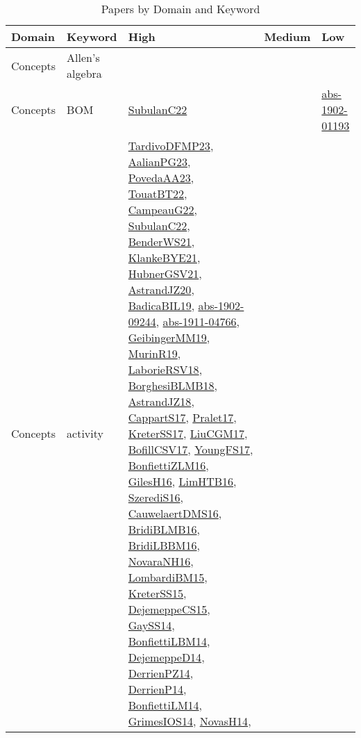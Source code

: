 {\scriptsize
\begin{longtable}{lp{3cm}>{\raggedright}p{6cm}>{\raggedright}p{6cm}p{8cm}}
\caption{Papers by Domain and Keyword}\\ \toprule
Domain & Keyword & High & Medium & Low\\ \midrule\endhead
\bottomrule
\endfoot
Concepts & Allen's algebra &  &  & \\
Concepts & BOM & \href{articles/SubulanC22.pdf}{SubulanC22}\cite{SubulanC22} &  & \href{articles/abs-1902-01193.pdf}{abs-1902-01193}\cite{abs-1902-01193}\\
Concepts & activity & \href{papers/TardivoDFMP23.pdf}{TardivoDFMP23}\cite{TardivoDFMP23}, \href{papers/AalianPG23.pdf}{AalianPG23}\cite{AalianPG23}, \href{papers/PovedaAA23.pdf}{PovedaAA23}\cite{PovedaAA23}, \href{papers/TouatBT22.pdf}{TouatBT22}\cite{TouatBT22}, \href{articles/CampeauG22.pdf}{CampeauG22}\cite{CampeauG22}, \href{articles/SubulanC22.pdf}{SubulanC22}\cite{SubulanC22}, \href{papers/BenderWS21.pdf}{BenderWS21}\cite{BenderWS21}, \href{papers/KlankeBYE21.pdf}{KlankeBYE21}\cite{KlankeBYE21}, \href{articles/HubnerGSV21.pdf}{HubnerGSV21}\cite{HubnerGSV21}, \href{articles/AstrandJZ20.pdf}{AstrandJZ20}\cite{AstrandJZ20}, \href{papers/BadicaBIL19.pdf}{BadicaBIL19}\cite{BadicaBIL19}, \href{articles/abs-1902-09244.pdf}{abs-1902-09244}\cite{abs-1902-09244}, \href{articles/abs-1911-04766.pdf}{abs-1911-04766}\cite{abs-1911-04766}, \href{papers/GeibingerMM19.pdf}{GeibingerMM19}\cite{GeibingerMM19}, \href{papers/MurinR19.pdf}{MurinR19}\cite{MurinR19}, \href{articles/LaborieRSV18.pdf}{LaborieRSV18}\cite{LaborieRSV18}, \href{articles/BorghesiBLMB18.pdf}{BorghesiBLMB18}\cite{BorghesiBLMB18}, \href{papers/AstrandJZ18.pdf}{AstrandJZ18}\cite{AstrandJZ18}, \href{papers/CappartS17.pdf}{CappartS17}\cite{CappartS17}, \href{papers/Pralet17.pdf}{Pralet17}\cite{Pralet17}, \href{articles/KreterSS17.pdf}{KreterSS17}\cite{KreterSS17}, \href{papers/LiuCGM17.pdf}{LiuCGM17}\cite{LiuCGM17}, \href{papers/BofillCSV17.pdf}{BofillCSV17}\cite{BofillCSV17}, \href{papers/YoungFS17.pdf}{YoungFS17}\cite{YoungFS17}, \href{papers/BonfiettiZLM16.pdf}{BonfiettiZLM16}\cite{BonfiettiZLM16}, \href{papers/GilesH16.pdf}{GilesH16}\cite{GilesH16}, \href{papers/LimHTB16.pdf}{LimHTB16}\cite{LimHTB16}, \href{papers/SzerediS16.pdf}{SzerediS16}\cite{SzerediS16}, \href{papers/CauwelaertDMS16.pdf}{CauwelaertDMS16}\cite{CauwelaertDMS16}, \href{articles/BridiBLMB16.pdf}{BridiBLMB16}\cite{BridiBLMB16}, \href{papers/BridiLBBM16.pdf}{BridiLBBM16}\cite{BridiLBBM16}, \href{articles/NovaraNH16.pdf}{NovaraNH16}\cite{NovaraNH16}, \href{papers/LombardiBM15.pdf}{LombardiBM15}\cite{LombardiBM15}, \href{papers/KreterSS15.pdf}{KreterSS15}\cite{KreterSS15}, \href{papers/DejemeppeCS15.pdf}{DejemeppeCS15}\cite{DejemeppeCS15}, \href{papers/GaySS14.pdf}{GaySS14}\cite{GaySS14}, \href{articles/BonfiettiLBM14.pdf}{BonfiettiLBM14}\cite{BonfiettiLBM14}, \href{papers/DejemeppeD14.pdf}{DejemeppeD14}\cite{DejemeppeD14}, \href{papers/DerrienPZ14.pdf}{DerrienPZ14}\cite{DerrienPZ14}, \href{papers/DerrienP14.pdf}{DerrienP14}\cite{DerrienP14}, \href{papers/BonfiettiLM14.pdf}{BonfiettiLM14}\cite{BonfiettiLM14}, \href{articles/GrimesIOS14.pdf}{GrimesIOS14}\cite{GrimesIOS14}, \href{articles/NovasH14.pdf}{NovasH14}\cite{NovasH14}, 
\end{longtable}}
